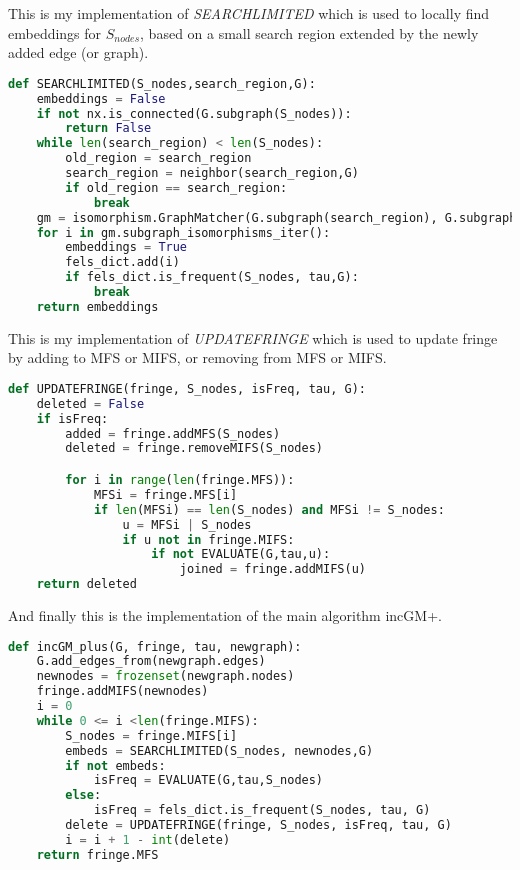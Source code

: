 \documentclass[a4paper, 12pt]{report}
\begin{document}
This is my implementation of \emph{SEARCHLIMITED} which is used to locally find embeddings for $S_{nodes}$, based on a small search region extended by the newly added edge (or graph).
\begin{lstlisting}[language=python, frame=single]
def SEARCHLIMITED(S_nodes,search_region,G):
    embeddings = False
    if not nx.is_connected(G.subgraph(S_nodes)):
        return False
    while len(search_region) < len(S_nodes):
        old_region = search_region
        search_region = neighbor(search_region,G)
        if old_region == search_region:
            break
    gm = isomorphism.GraphMatcher(G.subgraph(search_region), G.subgraph(S_nodes))
    for i in gm.subgraph_isomorphisms_iter():
        embeddings = True
        fels_dict.add(i)
        if fels_dict.is_frequent(S_nodes, tau,G):
            break
    return embeddings
\end{lstlisting}

This is my implementation of \emph{UPDATEFRINGE} which is used to update fringe by adding to MFS or MIFS, or removing from MFS or MIFS.
\begin{lstlisting}[language=python, frame=single]
def UPDATEFRINGE(fringe, S_nodes, isFreq, tau, G):
    deleted = False
    if isFreq:
        added = fringe.addMFS(S_nodes)
        deleted = fringe.removeMIFS(S_nodes)

        for i in range(len(fringe.MFS)):
            MFSi = fringe.MFS[i]
            if len(MFSi) == len(S_nodes) and MFSi != S_nodes:
                u = MFSi | S_nodes
                if u not in fringe.MIFS:
                    if not EVALUATE(G,tau,u):
                        joined = fringe.addMIFS(u)
    return deleted
\end{lstlisting}

And finally this is the implementation of the main algorithm incGM+.
\begin{lstlisting}[language=python, frame=single]
def incGM_plus(G, fringe, tau, newgraph):
    G.add_edges_from(newgraph.edges)
    newnodes = frozenset(newgraph.nodes)
    fringe.addMIFS(newnodes)
    i = 0
    while 0 <= i <len(fringe.MIFS):
        S_nodes = fringe.MIFS[i]
        embeds = SEARCHLIMITED(S_nodes, newnodes,G)
        if not embeds:
            isFreq = EVALUATE(G,tau,S_nodes)
        else:
            isFreq = fels_dict.is_frequent(S_nodes, tau, G)
        delete = UPDATEFRINGE(fringe, S_nodes, isFreq, tau, G)
        i = i + 1 - int(delete)
    return fringe.MFS
\end{lstlisting}
\end{document}
